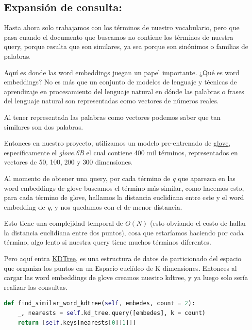 \documentclass{llncs}
\begin{document}
\subsection{Expansión de consulta:}


Hasta ahora solo trabajamos con los términos de nuestro vocabulario, pero que pasa cuando el documento que buscamos no contiene los términos de nuestra query, porque resulta que son similares, ya sea porque son sinónimos o familias de palabras.


Aquí es donde las word embeddings juegan un papel importante.
¿Qué es word embeddings?
No es más que un conjunto de modelos de lenguaje y técnicas de aprendizaje en procesamiento del lenguaje natural en dónde las palabras o frases del lenguaje natural son representadas como vectores de números reales.


Al tener representada las palabras como vectores podemos saber que tan similares son dos palabras.


Entonces en nuestro proyecto, utilizamos un modelo pre-entrenado de \href{https://nlp.stanford.edu/projects/glove/}{glove}\cite{pennington2014glove}, específicamente el \textit{glove.6B} el cual contiene 400 mil términos, representados en vectores de 50, 100, 200 y 300 dimensiones.


Al momento de obtener una query, por cada término de \textit{q} que aparezca en las word embeddings de glove buscamos el término más similar, como hacemos esto, para cada término de glove, hallamos la distancia euclidiana entre este y el word embedding de \textit{q}, y nos quedamos con el de menor distancia.


Esto tiene una complejidad temporal de $O(N)$ (esto obviando el costo de hallar la distancia euclidiana entre dos puntos), cosa que estaríamos haciendo por cada término, algo lento si nuestra query tiene muchos términos diferentes.


Pero aquí entra \href{https://es.wikipedia.org/wiki/\%C3\%81rbol_kd}{KDTree}, es una estructura de datos de particionado del espacio que organiza los puntos en un Espacio euclídeo de K dimensiones. Entonces al cargar las word embeddings de glove creamos nuestro kdtree, y ya luego solo sería realizar las consultas.

\begin{lstlisting}[language=Python]
def find_similar_word_kdtree(self, embedes, count = 2):
    _, nearests = self.kd_tree.query([embedes], k = count)
    return [self.keys[nearests[0][1]]]
\end{lstlisting}
\end{document}
